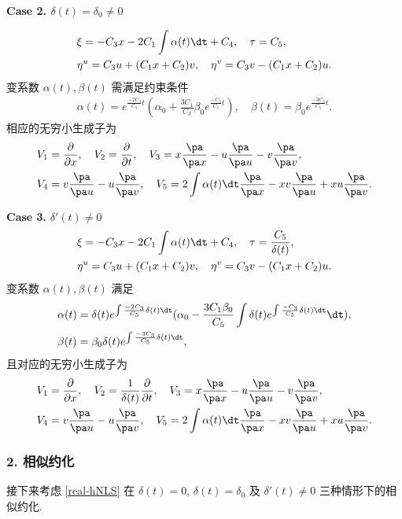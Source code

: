 \noindent \textbf{Case 2. $\delta(t)=\delta_0\neq0$}

\begin{align*}
&\xi=-C_3 x-2C_1\int\alpha(t)\dt+C_4,\quad \tau=C_5,\\
&\eta^u=C_3 u+(C_1x+C_2)v,\quad \eta^v=C_3 v-(C_1x+C_2)u.
\end{align*}
变系数 $\alpha(t), \beta(t)$ 需满足约束条件
\begin{align*}
\alpha(t)=e^{\frac{-2C_3}{C_5}t}(\alpha_0+\frac{3C_1}{C_3}\beta_0e^{\frac{-C_3}{C_5}t}),\quad \beta(t)=\beta_0e^{\frac{-3C_3}{C_5}t}.
\end{align*}
相应的无穷小生成子为
\begin{align*}
&V_1=\frac{\partial}{\partial x},\quad V_2=\frac{\partial}{\partial t},\quad
V_3=x\frac{\pa}{\pa x}-u\frac{\pa}{\pa u}-v\frac{\pa}{\pa v},\\
&V_4=v\frac{\pa}{\pa u}-u\frac{\pa}{\pa v},\quad
V_5=2\int \alpha(t)\dt\frac{\pa}{\pa x}-xv\frac{\pa}{\pa u}+xu\frac{\pa}{\pa v}.
\end{align*}


\noindent \textbf{Case 3.} $\delta'(t)\neq 0$\\
\begin{align*}
&\xi=-C_3 x-2C_1\int\alpha(t)\dt+C_4,\quad \tau=\frac{C_5}{\delta(t)},\\
&\eta^u=C_3 u+(C_1x+C_2)v,\quad \eta^v=C_3 v-(C_1x+C_2)u.
\end{align*}
变系数 $\alpha(t), \beta(t)$ 满足
\begin{align*}
&\alpha(t)=\delta(t)e^{\int\frac{-2C_3}{C_5}\delta(t)\dt} (\alpha_0-\frac{3C_1\beta_0}{C_5}\int\delta(t)e^{\int\frac{-C_3}{C_5}\delta(t)\dt}\dt),\notag\\ &\beta(t)=\beta_0\delta(t)e^{\int\frac{-3C_3}{C_5}\delta(t)\dt},
\end{align*}
且对应的无穷小生成子为
\begin{align*}
&V_1=\frac{\partial}{\partial x},\quad V_2=\frac{1}{\delta(t)}\frac{\partial}{\partial t},\quad
V_3=x\frac{\pa}{\pa x}-u\frac{\pa}{\pa u}-v\frac{\pa}{\pa v},\\
&V_4=v\frac{\pa}{\pa u}-u\frac{\pa}{\pa v},\quad
V_5=2\int \alpha(t)\dt\frac{\pa}{\pa x}-xv\frac{\pa}{\pa u}+xu\frac{\pa}{\pa v}.
\end{align*}
\subsubsection{2. 相似约化}
接下来考虑 \eqref{real-hNLS} 在 $\delta(t)=0$, $\delta(t)=\delta_0$ 及 $\delta'(t)\neq 0$ 三种情形下的相似约化.



